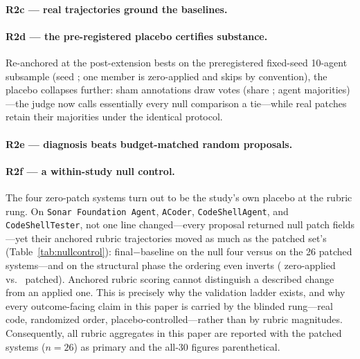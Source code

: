 \documentclass[11pt]{article}
\begin{document}
\paragraph{R2c --- real trajectories ground the baselines.}
\TRAJpara

\paragraph{R2d --- the pre-registered placebo certifies substance.}
{\sloppy\SHAMpara\par}
Re-anchored at the post-extension bests on the preregistered fixed-seed
10-agent subsample (seed \swShamReSeed; one member is zero-applied and
skips by convention), the placebo collapses further: sham annotations draw
\swShamReVotes{} votes (share \swShamReShare; \swShamReMaj{} agent
majorities)---the judge now calls essentially every null comparison a
tie---while real patches retain their majorities under the identical
protocol.

\paragraph{R2e --- diagnosis beats budget-matched random proposals.}
\RANDpara

\paragraph{R2f --- a within-study null control.}
The four zero-patch systems turn out to be the study's own placebo at the
rubric rung. On \texttt{Sonar Foundation Agent}, \texttt{ACoder},
\texttt{CodeShellAgent}, and \texttt{CodeShellTester}, not one line
changed---every proposal returned null patch fields---yet their anchored
rubric trajectories moved as much as the patched set's
(Table~\ref{tab:nullcontrol}): final$-$baseline \swDeltaFBnull{} on the
null four versus \swDeltaFBP{} on the 26 patched systems---and on the
structural phase the ordering even inverts (\swDeltaSBnull{} zero-applied
vs.\ \swDeltaSBP{} patched). Anchored rubric
scoring cannot distinguish a described change from an applied one. This is
precisely why the validation ladder exists, and why every outcome-facing
claim in this paper is carried by the blinded rung---real code, randomized
order, placebo-controlled---rather than by rubric magnitudes.
Consequently, all rubric aggregates in this paper are reported with the
patched systems ($n{=}26$) as primary and the all-30 figures parenthetical.
\end{document}
